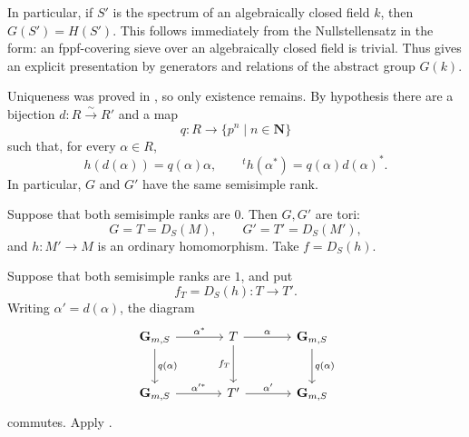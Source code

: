 In particular, if \(S'\) is the spectrum of an algebraically closed
field \(k\), then \(G(S')=H(S')\). This follows immediately from the
Nullstellensatz in the form: an fppf-covering sieve over an
algebraically closed field is trivial. Thus  gives an
explicit presentation by generators and relations of the abstract
group \(G(k)\).




Uniqueness was proved in , so only existence remains. By
hypothesis there are a bijection \(d:R\xrightarrow{\sim}R'\) and a
map
\[
  q:R\longrightarrow\{p^n\mid n\in\mathbf N\}
\]
such that, for every \(\alpha\in R\),
\[
  h(d(\alpha))=q(\alpha)\alpha,
  \qquad
  {}^th(\alpha^*)=q(\alpha)d(\alpha)^*.
\]
In particular, \(G\) and \(G'\) have the same semisimple rank.

Suppose that both semisimple ranks are \(0\). Then \(G,G'\) are
tori:
\[
  G=T=D_S(M),\qquad G'=T'=D_S(M'),
\]
and \(h:M'\to M\) is an ordinary homomorphism. Take \(f=D_S(h)\).

Suppose that both semisimple ranks are \(1\), and put
\[
  f_T=D_S(h):T\longrightarrow T'.
\]
Writing \(\alpha'=d(\alpha)\), the diagram
\[
\begin{tikzcd}[column sep=large,row sep=large]
\mathbf G_{m,S}\ar[r,"\alpha^*"]\ar[d,"q(\alpha)"]
  &T\ar[r,"\alpha"]\ar[d,"f_T"']
  &\mathbf G_{m,S}\ar[d,"q(\alpha)"]\\
\mathbf G_{m,S}\ar[r,"\alpha'^*"]
  &T'\ar[r,"\alpha'"]
  &\mathbf G_{m,S}
\end{tikzcd}
\]
commutes. Apply .

